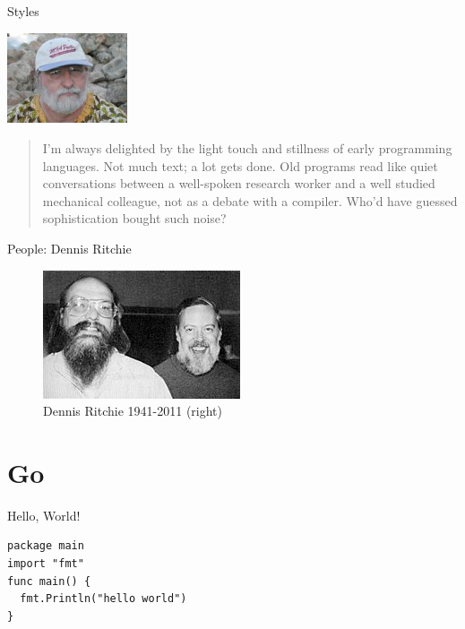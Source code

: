 \begin{frame}{Styles}
  \begin{center}
    \includegraphics[width=1.4in]{sections/img/richard-gabriel.jpg}
  \end{center}
  \begin{quote}
    I'm always delighted by the light touch and stillness of early programming languages.
    Not much text; a lot gets done.
    Old programs read like quiet conversations between a well-spoken research worker and a well studied mechanical colleague, not as a debate with a compiler.
    Who'd have guessed sophistication bought such noise? \\
    \hspace*{}
  \end{quote}

\end{frame}

\begin{frame}{People: Dennis Ritchie}
  \begin{figure}
  \includegraphics{sections/img/ritchie-thompson.jpg}
  \caption*{Dennis Ritchie 1941-2011 (right)}
  \end{figure}
\end{frame}



\section{Go}
\begin{frame}[fragile]{Hello, World!}
  \begin{verbatim}
package main
import "fmt"
func main() {
  fmt.Println("hello world")
}
  \end{verbatim}
\end{frame}
